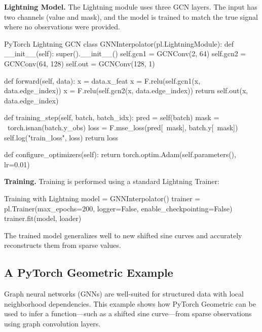 %
{\bf Lightning Model.} The Lightning module uses three GCN layers. The input has two channels (value and mask), and the model is trained to match the true signal where no observations were provided.

\begin{codeonly}{PyTorch Lightning GCN}
class GNNInterpolator(pl.LightningModule):
    def __init__(self):
        super().__init__()
        self.gcn1 = GCNConv(2, 64)
        self.gcn2 = GCNConv(64, 128)
        self.out  = GCNConv(128, 1)

    def forward(self, data):
        x = data.x_feat
        x = F.relu(self.gcn1(x, data.edge_index))
        x = F.relu(self.gcn2(x, data.edge_index))
        return self.out(x, data.edge_index)

    def training_step(self, batch, batch_idx):
        pred = self(batch)
        mask = ~torch.isnan(batch.y_obs)
        loss = F.mse_loss(pred[~mask], batch.y[~mask])
        self.log("train_loss", loss)
        return loss

    def configure_optimizers(self):
        return torch.optim.Adam(self.parameters(), lr=0.01)
\end{codeonly}

%
{\bf Training.} Training is performed using a standard Lightning Trainer:

\begin{codeonly}{Training with Lightning}
model = GNNInterpolator()
trainer = pl.Trainer(max_epochs=200, logger=False, enable_checkpointing=False)
trainer.fit(model, loader)
\end{codeonly}

The trained model generalizes well to new shifted sine curves and accurately reconstructs them from sparse values.


%
\subsection{A PyTorch Geometric Example}

Graph neural networks (GNNs) are well-suited for structured data with local neighborhood dependencies. This example shows how PyTorch Geometric can be used to infer a function—such as a shifted sine curve—from sparse observations using graph convolution layers.

